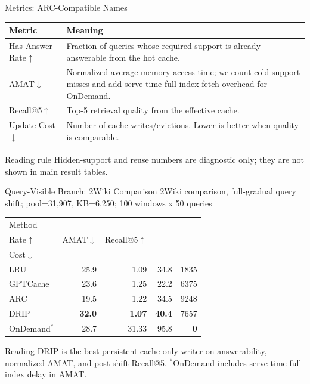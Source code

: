 \documentclass[aspectratio=169,10pt]{beamer}
\newcommand{\en}[1]{{\latinfont #1}}
\newcommand{\dive}{\en{DRIP}}
\newcommand{\arc}{\en{ARC}}
\newcommand{\lru}{\en{LRU}}
\newcommand{\ond}{\en{OnDemand}}
\newcommand{\gptc}{\en{GPTCache}}
\begin{document}
\begin{frame}{Metrics: ARC-Compatible Names}
  \small
  \begin{table}
  \centering
  \setlength{\tabcolsep}{7pt}
  \begin{tabular}{lp{}}
    \toprule
    Metric & Meaning \\
    \midrule
    \en{Has-Answer Rate}$\uparrow$ &
    Fraction of queries whose required support is already answerable from the hot cache. \\
    \en{AMAT}$\downarrow$ &
    Normalized average memory access time; we count cold support misses and add serve-time full-index fetch overhead for \ond{}. \\
    \en{Recall@5}$\uparrow$ &
    Top-5 retrieval quality from the effective cache. \\
    \en{Update Cost}$\downarrow$ &
    Number of cache writes/evictions. Lower is better when quality is comparable. \\
    \bottomrule
  \end{tabular}
  \end{table}

  \vspace{0.4em}
  \begin{alertblock}{Reading rule}
    Hidden-support and reuse numbers are diagnostic only; they are not shown in
    main result tables.
  \end{alertblock}
\end{frame}

\begin{frame}{Query-Visible Branch: 2Wiki Comparison}
  \scriptsize
  \en{2Wiki comparison, full-gradual query shift; pool=31,907, KB=6,250; 100 windows x 50 queries}

  \begin{table}
  \centering
  \renewcommand{\arraystretch}{1.08}
  \setlength{\tabcolsep}{5.5pt}
  \begin{tabular}{lrrrr}
    \toprule
    Method & \shortstack{\en{Has-Answer}\\\en{Rate}$\uparrow$} & \en{AMAT}$\downarrow$ & \en{Recall@5}$\uparrow$ & \shortstack{\en{Update}\\\en{Cost}$\downarrow$} \\
    \midrule
    \lru{} & 25.9 & 1.09 & 34.8 & 1835 \\
    \gptc{} & 23.6 & 1.25 & 22.2 & 6375 \\
    \arc{} & 19.5 & 1.22 & 34.5 & 9248 \\
    \dive{} & \textbf{32.0} & \textbf{1.07} & \textbf{40.4} & 7657 \\
    \ond{}$^*$ & 28.7 & 31.33 & 95.8 & \textbf{0} \\
    \bottomrule
  \end{tabular}
  \end{table}

  \begin{block}{Reading}
    \dive{} is the best persistent cache-only writer on answerability,
    normalized \en{AMAT}, and post-shift \en{Recall@5}. $^*$\ond{} includes
    serve-time full-index delay in \en{AMAT}.
  \end{block}
\end{frame}
\end{document}
